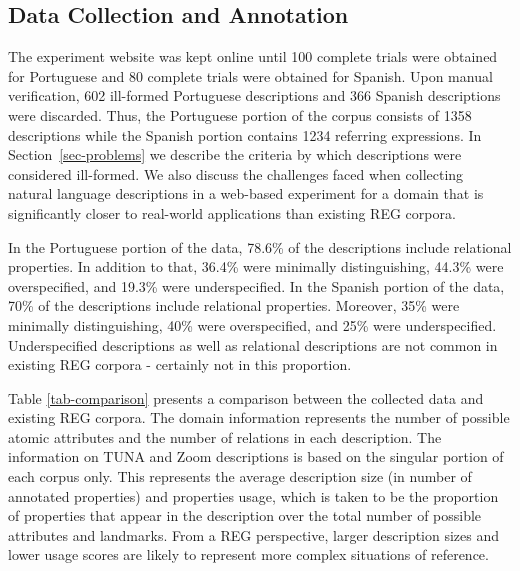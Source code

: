\subsection{Data Collection and Annotation}
\label{sec-annotation}

The experiment website was kept online until 100 complete trials were obtained for Portuguese and 80 complete trials were obtained for Spanish. Upon manual verification, 602 ill-formed Portuguese descriptions and 366 Spanish descriptions were discarded. Thus, the Portuguese portion of the corpus consists of 1358 descriptions while the Spanish portion contains 1234 referring expressions. In Section~\ref{sec-problems} we describe the criteria by which descriptions were considered ill-formed. We also discuss the challenges faced when collecting natural language descriptions in a web-based experiment for a domain that is significantly closer to real-world applications than existing REG corpora. 

In the Portuguese portion of the data, 78.6\% of the descriptions include relational properties. In addition to that, 36.4\% were minimally distinguishing, 44.3\% were overspecified, and  19.3\% were underspecified. In the Spanish portion of the data, 70\% of the descriptions include relational properties. Moreover, 35\% were minimally distinguishing, 40\% were overspecified, and 25\% were underspecified. Underspecified descriptions as well as relational descriptions are not common in existing REG corpora - certainly not in this proportion.  

Table \ref{tab-comparison} presents a comparison between the collected data and existing REG corpora. The domain information represents the number of possible atomic attributes and the number of relations in each description. The information on TUNA and Zoom descriptions is based on the singular portion of each corpus only. This represents the average description size (in number of annotated properties) and properties usage, which is taken to be  the proportion of properties that appear in the description over the total number of possible attributes and landmarks. From a REG perspective, larger description sizes and lower usage scores are likely to represent more complex situations of reference.



